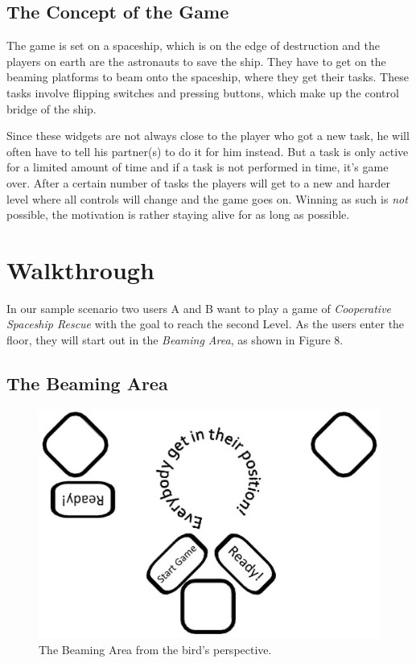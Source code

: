 \documentclass{sigchi}
\begin{document}
\subsection{The Concept of the Game}
\vspace{1mm}
The game is set on a spaceship, which is on the edge of destruction and the players on earth are the astronauts to save the ship. They have to get on the beaming platforms to beam onto the spaceship, where they get their tasks. These tasks involve flipping switches and pressing buttons, which make up the control bridge of the ship. 

Since these widgets are not always close to the player who got a new task, he will often have to tell his partner(s) to do it for him instead. But a task is only active for a limited amount of time and if a task is not performed in time, it's game over. \newline
After a certain number of tasks the players will get to a new and harder level where all controls will change and the game goes on. Winning as such is \textit{not} possible, the motivation is rather staying alive for as long as possible.
\section{Walkthrough}
\vspace{1mm}
In our sample scenario two users A and B want to play a game of \textit{Cooperative Spaceship Rescue} with the goal to reach the second Level. As the users enter the floor, they will start out in the \textit{Beaming Area}, as shown in Figure 8.

\subsection{The Beaming Area}
\vspace{3mm}

\begin{figure}[h]
\centering
\includegraphics[width=0.8\columnwidth]{beamingArea}
\caption{The Beaming Area from the bird's perspective.}
\label{fig:beamingArea}
\end{figure}
\end{document}
